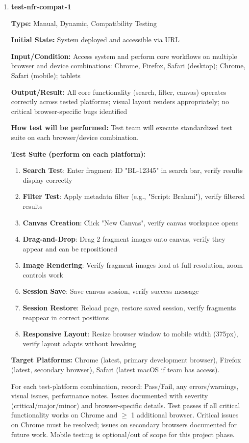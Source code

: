 \documentclass[12pt, titlepage]{article}
\begin{document}
\begin{enumerate}

\item \textbf{test-nfr-compat-1}

\textbf{Type:} Manual, Dynamic, Compatibility Testing
					
\textbf{Initial State:} System deployed and accessible via URL
					
\textbf{Input/Condition:} Access system and perform core workflows on multiple browser and device combinations: Chrome, Firefox, Safari (desktop); Chrome, Safari (mobile); tablets
					
\textbf{Output/Result:} All core functionality (search, filter, canvas) operates correctly across tested platforms; visual layout renders appropriately; no critical browser-specific bugs identified
					
\textbf{How test will be performed:} Test team will execute standardized test suite on each browser/device combination.

\textbf{Test Suite (perform on each platform):}
\begin{enumerate}
\item \textbf{Search Test}: Enter fragment ID "BL-12345" in search bar, verify results display correctly
\item \textbf{Filter Test}: Apply metadata filter (e.g., "Script: Brahmi"), verify filtered results
\item \textbf{Canvas Creation}: Click "New Canvas", verify canvas workspace opens
\item \textbf{Drag-and-Drop}: Drag 2 fragment images onto canvas, verify they appear and can be repositioned
\item \textbf{Image Rendering}: Verify fragment images load at full resolution, zoom controls work
\item \textbf{Session Save}: Save canvas session, verify success message
\item \textbf{Session Restore}: Reload page, restore saved session, verify fragments reappear in correct positions
\item \textbf{Responsive Layout}: Resize browser window to mobile width (375px), verify layout adapts without breaking
\end{enumerate}

\textbf{Target Platforms:} Chrome (latest, primary development browser), Firefox (latest, secondary browser), Safari (latest macOS if team has access).

For each test-platform combination, record: Pass/Fail, any errors/warnings, visual issues, performance notes. Issues documented with severity (critical/major/minor) and browser-specific details. Test passes if all critical functionality works on Chrome and $\geq$ 1 additional browser. Critical issues on Chrome must be resolved; issues on secondary browsers documented for future work. Mobile testing is optional/out of scope for this project phase.

\end{enumerate}
\end{document}
